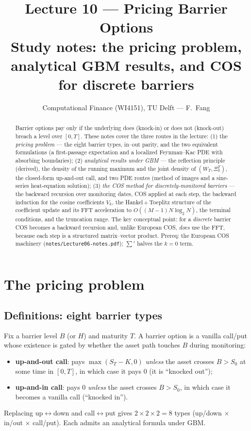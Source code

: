 \documentclass[11pt]{article}
\title{\textbf{Lecture 10 --- Pricing Barrier Options}\\[2pt]
\large Study notes: the pricing problem, analytical GBM results, and COS for discrete barriers}
\author{Computational Finance (WI4151), TU Delft --- F.\ Fang}
\date{}
\newcommand{\Max}{\Xi}
\begin{document}
\maketitle
\vspace{-1.2em}

\begin{abstract}
\noindent Barrier options pay only if the underlying does (knock-in) or does not (knock-out) breach a
level over $[0,T]$. These notes cover the three routes in the lecture: (1) the \emph{pricing problem} ---
the eight barrier types, in--out parity, and the two equivalent formulations (a first-passage expectation
and a localized Feynman--Kac PDE with absorbing boundaries); (2) \emph{analytical results under GBM} ---
the reflection principle (derived), the density of the running maximum and the joint density of $(W_T,\Max_0^T)$,
the closed-form up-and-out call, and two PDE routes (method of images and a sine-series heat-equation
solution); (3) \emph{the COS method for discretely-monitored barriers} --- the backward recursion over
monitoring dates, COS applied at each step, the backward induction for the cosine coefficients $V_k$, the
Hankel\,+\,Toeplitz structure of the coefficient update and its FFT acceleration to
$O((M{-}1)N\log_2 N)$, the terminal conditions, and the truncation range. The key conceptual point: for a
\emph{discrete} barrier COS becomes a backward recursion and, unlike European COS, \emph{does} use the FFT,
because each step is a structured matrix--vector product. Prereq: the European COS machinery
(\texttt{notes/Lecture06-notes.pdf}); $\sum'$ halves the $k=0$ term.
\end{abstract}

\tableofcontents

\section{The pricing problem}\label{sec:problem}

\subsection{Definitions: eight barrier types}
Fix a barrier level $B$ (or $H$) and maturity $T$. A barrier option is a vanilla call/put whose existence is
gated by whether the asset path touches $B$ during monitoring:
\begin{itemize}[leftmargin=*]
  \item \textbf{up-and-out call}: pays $\max(S_T-K,0)$ \emph{unless} the asset crosses $B>S_0$ at some
  time in $[0,T]$, in which case it pays $0$ (it is ``knocked out'');
  \item \textbf{up-and-in call}: pays $0$ \emph{unless} the asset crosses $B>S_0$, in which case it
  becomes a vanilla call (``knocked in'').
\end{itemize}
Replacing up$\leftrightarrow$down and call$\leftrightarrow$put gives $2\times2\times2=8$ types
(up/down $\times$ in/out $\times$ call/put). Each admits an analytical formula under GBM.
\end{document}
